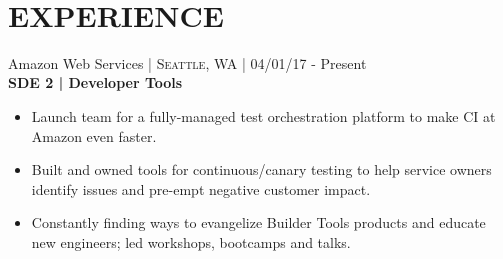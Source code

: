 \documentclass[10pt]{article} %
\begin{document}
\color{text1} %


\par{\\ %
	

\begin{minipage}[t]{0.57\textwidth} %
\vspace{0pt} %
	

\section{\uppercase{\textbf{Experience}}}


{\raggedright\large Amazon Web Services \normalsize\textsc{ | Seattle, WA} | 04/01/17 - Present\\
\textbf{SDE 2 | Developer Tools}\\[5pt]}
\vspace{0pt}
\begin{itemize}\itemsep-0.25em
    \item Launch team for a fully-managed test orchestration platform to make CI at Amazon even faster.
    \item Built and owned tools for continuous/canary testing to help service owners identify issues and pre-empt negative customer impact.
    \item Constantly finding ways to evangelize Builder Tools products and educate new engineers; led workshops, bootcamps and talks.
\end{itemize}\\


\end{minipage}}
\end{document}
